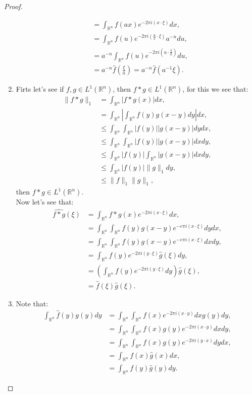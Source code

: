 \begin{proof}
\begin{enumerate}
\begin{align*}
				&=\int_{\mathbb{R}^n}f(ax)e^{-2\pi i (x\cdot\xi)}dx,\\
				&=\int_{\mathbb{R}^n}f(u)e^{-2\pi i (\frac{u}{x}\cdot\xi)}a^{-n}du,\\
				&=a^{-n}\int_{\mathbb{R}^n}f(u)e^{-2\pi i (u\cdot\frac{\xi}{a})}du,\\
				&=a^{-n}\hat{f}\left(\frac{\xi}{a}\right)=a^{-n}\hat{f}(a^{-1}\xi).
			\end{align*}
		\item Firts let's see if $f,g\in L^{1}(\mathbb{R}^n)$, then $f*g\in L^{1}(\mathbb{R}^n)$, for this we see that:
			\begin{align*}
				\|f*g\|_{1}&=\int_{\mathbb{R}^n}|f*g(x)|dx,\\
				&=\int_{\mathbb{R}^n}\left|\int_{\mathbb{R}^n}f(y)g(x-y)dy\right|dx,\\
				&\leq\int_{\mathbb{R}^n}\int_{\mathbb{R}^n}|f(y)||g(x-y)|dydx,\\
				&\leq\int_{\mathbb{R}^n}\int_{\mathbb{R}^n}|f(y)||g(x-y)|dxdy,\\
				&\leq\int_{\mathbb{R}^n}|f(y)|\int_{\mathbb{R}^n}|g(x-y)|dxdy,\\
				&\leq\int_{\mathbb{R}^n}|f(y)|\|g\|_{1}dy,\\
				&\leq\|f\|_{1}\|g\|_{1},
			\end{align*}
			then $f*g\in L^{1}(\mathbb{R}^n)$.\\
			Now let's see that:
			\begin{align*}
				\widehat{f*g}(\xi)&=\int_{\mathbb{R}^n}f*g(x)e^{-2\pi i (x\cdot\xi)}dx,\\
				&=\int_{\mathbb{R}^n}\int_{\mathbb{R}^n}f(y)g(x-y)e^{-e\pi i (x\cdot\xi)}dydx,\\
				&=\int_{\mathbb{R}^n}\int_{\mathbb{R}^n}f(y)g(x-y)e^{-e\pi i (x\cdot\xi)}dxdy,\\
				&=\int_{\mathbb{R}^n}f(y)e^{-2\pi i (y\cdot \xi)}\hat{g}(\xi)dy,\\
				&=\left(\int_{\mathbb{R}^n}f(y)e^{-2\pi i (y\cdot \xi)}dy\right) \hat{g}(\xi),\\
				&=\hat{f}(\xi)\hat{g}(\xi).
			\end{align*}
		\item Note that:
			\begin{align*}
				\int_{\mathbb{R}^n}\hat{f}(y)g(y)dy&=\int_{\mathbb{R}^n}\int_{\mathbb{R}^n}f(x)e^{-2\pi i(x\cdot y)}dxg(y)dy,\\
				&=\int_{\mathbb{R}^n}\int_{\mathbb{R}^n}f(x)g(y)e^{-2\pi i(x\cdot y)}dxdy,\\
				&=\int_{\mathbb{R}^n}\int_{\mathbb{R}^n}f(x)g(y)e^{-2\pi i(y\cdot x)}dydx,\\
				&=\int_{\mathbb{R}^n}f(x)\hat{g}(x)dx,\\
				&=\int_{\mathbb{R}^n}f(y)\hat{g}(y)dy.
			\end{align*}
	\end{enumerate}
\end{proof}

